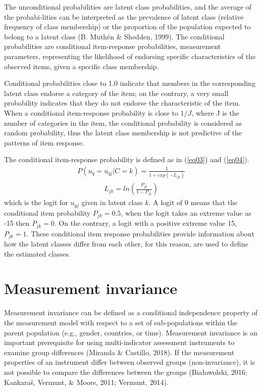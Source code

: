 \documentclass[12pt,a4paper,oneside]{reedthesis}
\begin{document}
The unconditional probabilities are latent class probabilities, and the average of the probabi-lities can be interpreted as the prevalence of latent class (relative frequency of class membership) or the proportion of the population expected to belong to a latent class (B. Muthén \& Shedden, 1999). The conditional probabilities are conditional item-response probabilities, measurement parameters, representing the likelihood of endorsing specific characteristics of the observed items, given a specific class membership.

Conditional probabilities close to 1.0 indicate that members in the corresponding latent class endorse a category of the item; on the contrary, a very small probability indicates that they do not endorse the characteristic of the item. When a conditional item-response probability is close to \(1/J\), where J is the number of categories in the item, the conditional probability is considered as random probability, thus the latent class membership is not predictive of the patterns of item response.

The conditional item-response probability is defined as in (\ref{eq03}) and (\ref{eq04}).
\begin{align}
P(u_q = u_{qj}|C=k) = \frac{1}{1+exp(-L_{jk})} \label{eq03}
\end{align}
\begin{align}
L_{jk}=ln(\frac{P_{jk}}{1-P_{jk}}) \label{eq04}
\end{align}
which is the logit for \(u_{qj}\) given in latent class \(k\). A logit of 0 means that the conditional item probability \(P_{jk}=0.5\), when the logit takes an extreme value as -15 then \(P_{jk}=0\). On the contrary, a logit with a positive extreme value 15, \(P_{jk}=1\). These conditional item response probabilities provide information about how the latent classes differ from each other, for this reason, are used to define the estimated classes.

\hypertarget{measurement-invariance}{%
\section{Measurement invariance}\label{measurement-invariance}}

Measurement invariance can be defined as a conditional independence property of the measurement model with respect to a set of sub-populations within the parent population (e.g., gender, countries, or time). Measurement invariance is an important prerequisite for using multi-indicator assessment instruments to examine group differences (Miranda \& Castillo, 2018). If the measurement properties of an instrument differ between observed groups (non-invariance), it is not possible to compare the differences between the groups (Białowolski, 2016; Kankaraš, Vermunt, \& Moors, 2011; Vermunt, 2014).
\end{document}
